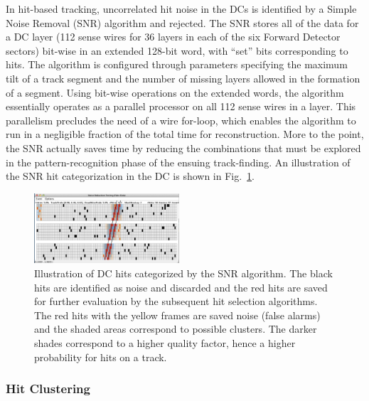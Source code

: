 In hit-based tracking, uncorrelated hit noise in the DCs is identified by a Simple Noise Removal (SNR) algorithm
and rejected. The SNR stores all of the data for a DC layer (112 sense wires for 36 layers in each of the six Forward
Detector sectors) bit-wise in an extended 128-bit word, with ``set'' bits corresponding to hits. The algorithm is
configured through parameters specifying the maximum tilt of a track segment and the number of missing layers
allowed in the formation of a segment. Using bit-wise operations on the extended words, the algorithm essentially
operates as a parallel processor on all 112 sense wires in a layer. This parallelism precludes the need of a wire
for-loop, which enables the algorithm to run in a negligible fraction of the total time for reconstruction. More to the
point, the SNR actually saves time by reducing the combinations that must be explored in the pattern-recognition
phase of the ensuing track-finding. An illustration of the SNR hit categorization in the DC is shown in
Fig.~\ref{fig:snr}.

\begin{figure}
\centering
\includegraphics[width=0.48\textwidth]{pics/dcPattern9.png}
\caption{Illustration of DC hits categorized by the SNR algorithm. The black hits are identified as noise and
  discarded and the red hits are saved for further evaluation by the subsequent hit selection algorithms. The red
  hits with the yellow frames are saved noise (false alarms) and the shaded areas correspond to possible clusters.
  The darker shades correspond to a higher quality factor, hence a higher probability for hits on a track.}
\label{fig:snr}
\end{figure}

\subsubsection{Hit Clustering}


